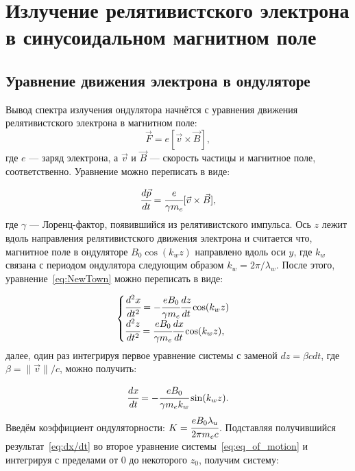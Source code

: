 \section{Излучение релятивистского электрона в синусоидальном магнитном поле}
\subsection{Уравнение движения электрона в ондуляторе}
Вывод спектра излучения ондулятора начнётся с уравнения движения релятивистского электрона в магнитном поле:
\begin{equation}
	\vec{F} = e[\vec{v} \times \vec{B}],
\end{equation} 
где $e$ --- заряд электрона, а $\vec{v}$ и $\vec{B}$ --- скорость частицы и магнитное поле, соответственно. Уравнение можно переписать в виде:

\begin{equation}
	\label{eq:NewTown}
	\cfrac{d\vec{p}}{dt} = \cfrac{e}{\gamma m_e}[\vec{v} \times \vec{B}],
\end{equation}
где $\gamma$ --- Лоренц-фактор, появившийся из релятивистского импульса. Ось $z$ лежит вдоль направления релятивистского движения электрона и считается что, магнитное поле в ондуляторе $B_0\cos(k_w z)$ направлено вдоль оси $y$, где $k_w$ связана с периодом ондулятора следующим образом $k_w = 2\pi/\lambda_w$. После этого, уравнение~\ref{eq:NewTown} можно переписать в виде:

\begin{equation}
	\label{eq:eq_of_motion}
	\begin{cases}
		\cfrac{d^2 x}{dt^2} = - \cfrac{e B_0}{\gamma m_e}\cfrac{dz}{dt} \cos(k_w z)\\
		\cfrac{d^2 z}{dt^2} = \cfrac{e B_0}{\gamma m_e}\cfrac{dx}{dt} \cos(k_w z),
	\end{cases} 
\end{equation}
далее, один раз интегрируя первое уравнение системы с заменой $dz = \beta cdt$, где $\beta = \|\vec{v}\| /c$, можно получить: 

\begin{equation}
 	\label{eq:dx/dt}
	\cfrac{dx}{dt} = - \cfrac{eB_0}{\gamma m_ek_w} \sin(k_w z).
\end{equation}
Введём коэффициент ондуляторности: $K = \cfrac{eB_0 \lambda_u}{2 \pi m_e c}$.
Подставляя получившийся результат~\ref{eq:dx/dt} во второе уравнение системы~\ref{eq:eq_of_motion} и интегрируя с пределами от $0$ до некоторого $z_0$, получим систему:

